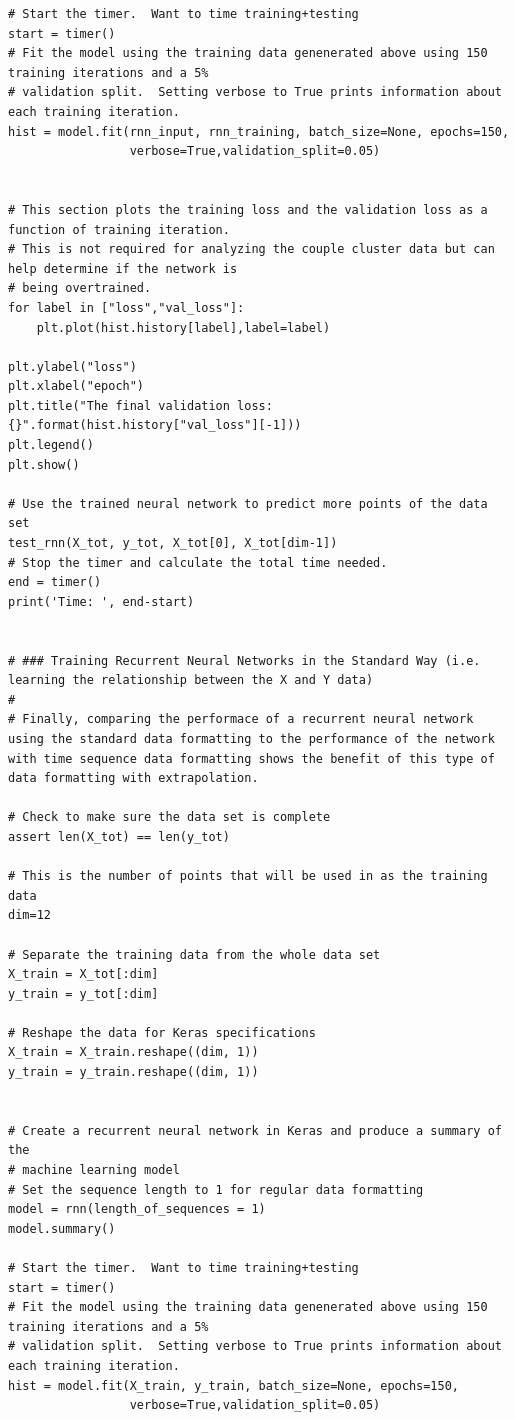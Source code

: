 \documentclass[%
oneside,                 %
final,                   %
10pt]{article}
\begin{document}
\begin{verbatim}
# Start the timer.  Want to time training+testing
start = timer()
# Fit the model using the training data genenerated above using 150 training iterations and a 5%
# validation split.  Setting verbose to True prints information about each training iteration.
hist = model.fit(rnn_input, rnn_training, batch_size=None, epochs=150, 
                 verbose=True,validation_split=0.05)


# This section plots the training loss and the validation loss as a function of training iteration.
# This is not required for analyzing the couple cluster data but can help determine if the network is
# being overtrained.
for label in ["loss","val_loss"]:
    plt.plot(hist.history[label],label=label)

plt.ylabel("loss")
plt.xlabel("epoch")
plt.title("The final validation loss: {}".format(hist.history["val_loss"][-1]))
plt.legend()
plt.show()

# Use the trained neural network to predict more points of the data set
test_rnn(X_tot, y_tot, X_tot[0], X_tot[dim-1])
# Stop the timer and calculate the total time needed.
end = timer()
print('Time: ', end-start)


# ### Training Recurrent Neural Networks in the Standard Way (i.e. learning the relationship between the X and Y data)
# 
# Finally, comparing the performace of a recurrent neural network using the standard data formatting to the performance of the network with time sequence data formatting shows the benefit of this type of data formatting with extrapolation.

# Check to make sure the data set is complete
assert len(X_tot) == len(y_tot)

# This is the number of points that will be used in as the training data
dim=12

# Separate the training data from the whole data set
X_train = X_tot[:dim]
y_train = y_tot[:dim]

# Reshape the data for Keras specifications
X_train = X_train.reshape((dim, 1))
y_train = y_train.reshape((dim, 1))


# Create a recurrent neural network in Keras and produce a summary of the 
# machine learning model
# Set the sequence length to 1 for regular data formatting 
model = rnn(length_of_sequences = 1)
model.summary()

# Start the timer.  Want to time training+testing
start = timer()
# Fit the model using the training data genenerated above using 150 training iterations and a 5%
# validation split.  Setting verbose to True prints information about each training iteration.
hist = model.fit(X_train, y_train, batch_size=None, epochs=150, 
                 verbose=True,validation_split=0.05)



\end{verbatim}
\end{document}

